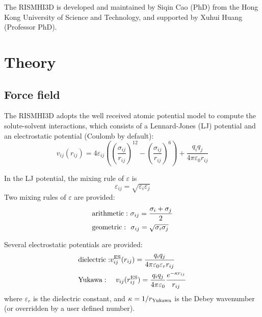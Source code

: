 \documentclass[aip,amsmath,amssymb,reprint,onecolumn]{revtex4-1}
\begin{document}
The RISMHI3D is developed and maintained by Siqin Cao (PhD) from the Hong Kong University of Science and Technology, and supported by Xuhui Huang (Professor PhD).


\section{Theory}

\subsection{Force field}

The RISMHI3D adopts the well received atomic potential model to compute the solute-solvent interactions, which consists of a Lennard-Jones (LJ) potential and an electrostatic potential (Coulomb by default):
\begin{equation*}
    v_{ij}(r_{ij}) = 4\varepsilon_{ij}\left(\left(\frac{\sigma_{ij}}{r_{ij}}\right)^{12} - \left(\frac{\sigma_{ij}}{r_{ij}}\right)^6 \right) + \frac{q_iq_j}{4\pi\varepsilon_0r_{ij}}
\end{equation*}

In the LJ potential, the mixing rule of $\varepsilon$ is
\begin{equation*}
    \varepsilon_{ij}=\sqrt{\varepsilon_i\varepsilon_j}
\end{equation*}
Two mixing rules of $\varepsilon$ are provided:
\begin{equation*}\begin{split}
    &{\rm arithmetic:\ } \sigma_{ij} = \frac{\sigma_i+\sigma_j}{2} \\
    &{\rm geometric:\ \ } \sigma_{ij} = \sqrt{\sigma_i\sigma_j} \\
\end{split}\end{equation*}

Several electrostatic potentials are provided:
\begin{equation*}\begin{split}
    &{\rm dielectric:} v^{\rm ES}_{ij}(r_{ij}) = \frac{q_iq_j}{4\pi\varepsilon_0\varepsilon_rr_{ij}} \\
    &{\rm Yukawa:\ \ \ \ } v_{ij}(r^{\rm ES}_{ij}) = \frac{q_iq_j}{4\pi\varepsilon_0}\frac{e^{-\kappa r_{ij}}}{r_{ij}} \\
\end{split}\end{equation*}
where $\varepsilon_r$ is the dielectric constant, and $\kappa=1/r_{\rm Yukawa}$ is the Debey wavenumber (or overridden by a user defined number).
\end{document}
